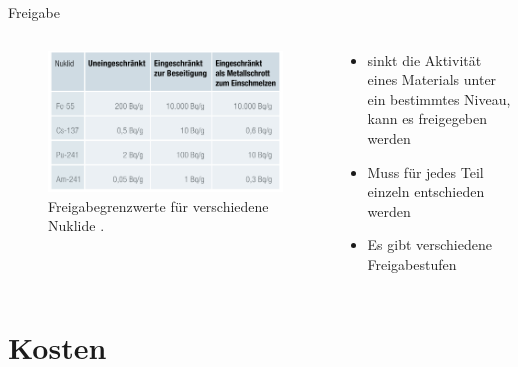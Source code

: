 \begin{frame}{Freigabe}
  \begin{columns}

    \begin{column}{0.48\textwidth}
      \begin{figure}
         \centering
         \includegraphics[width=1\textwidth]{./bilder/freigabeoption.PNG}
         \caption{Freigabegrenzwerte für verschiedene Nuklide \cite{stilllegung_grs}. }
         \label{ fig: freigabegrenzwerte}
       \end{figure}
    \end{column}

    \begin{column}{0.48\textwidth}
      \begin{itemize}
        \setlength\itemsep{1.2em}
        \item{ sinkt die Aktivität eines Materials unter ein bestimmtes Niveau, kann es freigegeben werden }
        \item{ Muss für jedes Teil einzeln entschieden werden}
        \item {Es gibt verschiedene Freigabestufen}
      \end{itemize}
    \end{column}

  \end{columns}
\end{frame}



\section{Kosten}



